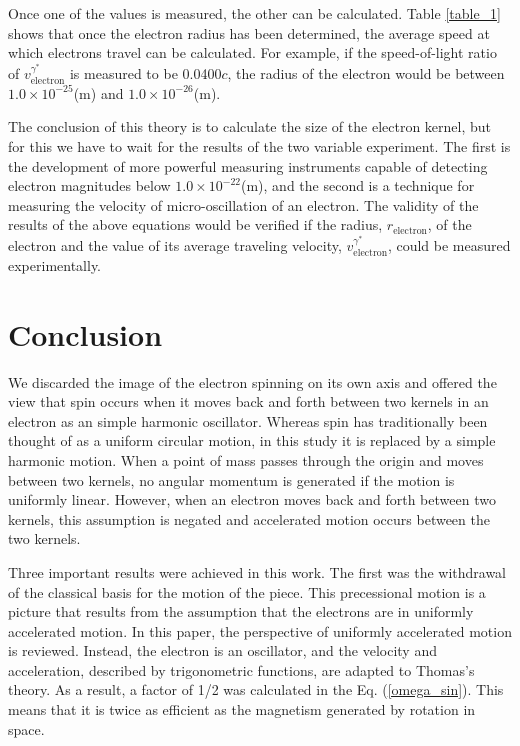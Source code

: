 \documentclass[%
 reprint,
 amsmath,amssymb,
 aps,
]{revtex4-1}
\numberwithin{equation}{section}%
\begin{document}
Once one of the values is measured, the other can be calculated. Table \ref{table_1} shows that once the electron radius has been determined, the average speed at which electrons travel can be calculated. For example, if the speed-of-light ratio of $ v_{\text{electron}}^{\gamma^{*}} $ is measured to be 0.0400$c$, the radius of the electron would be between $1.0 \times 10^{-25}$(m) and $1.0 \times 10^{-26}$(m).


The conclusion of this theory is to calculate the size of the electron kernel, but for this we have to wait for the results of the two variable experiment. The first is the development of more powerful measuring instruments capable of detecting electron magnitudes below $1.0 \times 10^{-22}$(m), and the second is a technique for measuring the velocity of micro-oscillation of an electron. The validity of the results of the above equations would be verified if the radius, $r_{\mathrm{electron}}$, of the electron and the value of its average traveling velocity, $ v_{\text{electron}}^{\gamma^{*}} $, could be measured experimentally.


\section{Conclusion}


We discarded the image of the electron spinning on its own axis and offered the view that spin occurs when it moves back and forth between two kernels in an electron as an simple harmonic oscillator. Whereas spin has traditionally been thought of as a uniform circular motion, in this study it is replaced by a simple harmonic motion. When a point of mass passes through the origin and moves between two kernels, no angular momentum is generated if the motion is uniformly linear. However, when an electron moves back and forth between two kernels, this assumption is negated and accelerated motion occurs between the two kernels.

Three important results were achieved in this work. The first was the withdrawal of the classical basis for the motion of the piece. This precessional motion is a picture that results from the assumption that the electrons are in uniformly accelerated motion. In this paper, the perspective of uniformly accelerated motion is reviewed. Instead, the electron is an oscillator, and the velocity and acceleration, described by trigonometric functions, are adapted to Thomas's theory. As a result, a factor of 1/2 was calculated in the Eq. (\ref{omega_sin}). This means that it is twice as efficient as the magnetism generated by rotation in space.
\end{document}
